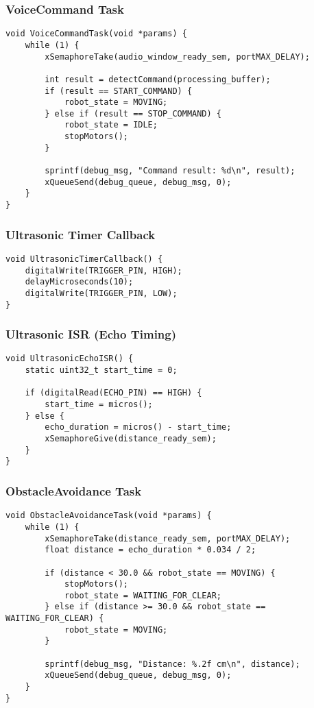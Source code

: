\newpage
\subsubsection*{VoiceCommand Task}
\begin{verbatim}
void VoiceCommandTask(void *params) {
    while (1) {
        xSemaphoreTake(audio_window_ready_sem, portMAX_DELAY);
        
        int result = detectCommand(processing_buffer);
        if (result == START_COMMAND) {
            robot_state = MOVING;
        } else if (result == STOP_COMMAND) {
            robot_state = IDLE;
            stopMotors();
        }

        sprintf(debug_msg, "Command result: %d\n", result);
        xQueueSend(debug_queue, debug_msg, 0);
    }
}
\end{verbatim}

\subsubsection*{Ultrasonic Timer Callback}
\begin{verbatim}
void UltrasonicTimerCallback() {
    digitalWrite(TRIGGER_PIN, HIGH);
    delayMicroseconds(10);
    digitalWrite(TRIGGER_PIN, LOW);
}
\end{verbatim}

\newpage
\subsubsection*{Ultrasonic ISR (Echo Timing)}
\begin{verbatim}
void UltrasonicEchoISR() {
    static uint32_t start_time = 0;

    if (digitalRead(ECHO_PIN) == HIGH) {
        start_time = micros();
    } else {
        echo_duration = micros() - start_time;
        xSemaphoreGive(distance_ready_sem);
    }
}
\end{verbatim}

\subsubsection*{ObstacleAvoidance Task}
\begin{verbatim}
void ObstacleAvoidanceTask(void *params) {
    while (1) {
        xSemaphoreTake(distance_ready_sem, portMAX_DELAY);
        float distance = echo_duration * 0.034 / 2;

        if (distance < 30.0 && robot_state == MOVING) {
            stopMotors();
            robot_state = WAITING_FOR_CLEAR;
        } else if (distance >= 30.0 && robot_state == WAITING_FOR_CLEAR) {
            robot_state = MOVING;
        }

        sprintf(debug_msg, "Distance: %.2f cm\n", distance);
        xQueueSend(debug_queue, debug_msg, 0);
    }
}
\end{verbatim}


